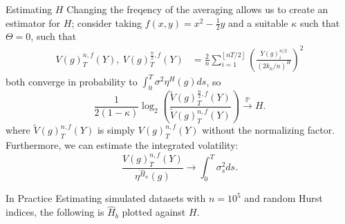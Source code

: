 \documentclass[final,hyperref={pdfpagelabels=false}]{beamer}
\begin{document}
\begin{frame}{}
\begin{columns}[t]
      \begin{column}{0.28\linewidth}
        \begin{block}{Estimating \(H\)}
          Changing the freqency of the averaging allows us to create an estimator for \(H\); consider taking \(f(x, y) = x^2 - \frac{1}{2}y\) and a suitable \(\kappa\) such that \(\Theta = 0\), such that 
          \begin{align*}
            V(g)^{n,f}_T(Y), \ V(g)^{\frac{n}{2},f}_T(Y) &= \frac{2}{n}\sum_{i=1}^{\left\lfloor nT/2 \right\rfloor} \left(\frac{\overline{Y}(g)^{n/2}_i}{(2k_n/n)^H}\right)^2
          \end{align*}
          both converge in probability to \( \int_0^T \sigma^2\eta^H(g) ds\), so
          \[
            \frac{1}{2(1 - \kappa)} \log_2\left(\frac{\widetilde{V}(g)^{\frac{n}{2},f}_T(Y)}{\widetilde{V}(g)^{n,f}_T(Y)}\right) \overset{\mathbb{P}}{\rightarrow} H.
          \]
          where \(\widetilde{V}(g)^{n,f}_T(Y)\) is simply \(V(g)^{n,f}_T(Y)\) without the normalizing factor.
          Furthermore, we can estimate the integrated volatility:
          \[
            \frac{V(g)^{n,f}_T(Y)}{\eta^{\hat{H}_n}(g)} \rightarrow \int_0^T\sigma^2_sds.
          \]
        \end{block}
        \begin{block}{In Practice}
          Estimating simulated datasets with \(n = 10^5\) and random Hurst indices, the following is \(\hat{H}_b\) plotted against \(H\).


\end{block}
\end{column}
\end{columns}
\end{frame}
\end{document}
